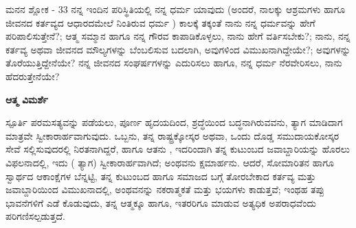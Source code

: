 \begin{mananam}{\mananamfont ಮನನ ಶ್ಲೋಕ - \textenglish{33}}
\footnotesize \mananamtext ನನ್ನ ಇಂದಿನ ಪರಿಸ್ಥಿತಿಯಲ್ಲಿ ನನ್ನ ಧರ್ಮ ಯಾವುದು (ಅಂದರೆ, ನಾಲಕ್ಕು ಆಶ್ರಮಗಳು ಹಾಗೂ ಜೀವನದ ಕರ್ತವ್ಯದ ಆಧಾರದಮೇಲೆ ನಿಂತಿರುವ ಧರ್ಮ ) ಕಾಲಕ್ಕೆ ತಕ್ಕಂತೆ ನಾನು ನನ್ನ ಧರ್ಮವನ್ನು ಹೇಗೆ ಪರಿಪಾಲಿಸುತ್ತೇನೆ?; ಆತ್ಮ ಸಮ್ಮಾನ ಹಾಗೂ ನನ್ನ ಗೌರವ ಕಾಪಾಡಿಕೊಳ್ಳಲು, ನಾನು ಹೇಗೆ ವರ್ತಿಸಬೇಕು?; ನಾನು, ನನ್ನ ಕರ್ತವ್ಯ ಅಥವಾ ಜೀವನದ ಮೌಲ್ಯಗಳನ್ನು ಬೆಂಬಲಿಸುವ ಬದಲಾಗಿ, ಅವುಗಳಿಂದ ವಿಮುಖನಾಗಿದ್ದೇಯೇ?; ಅವುಗಳನ್ನು ತೊರೆಯುತ್ತಿದ್ದೇನೆಯೇ? ನನ್ನ ಜೀವನದ ಸಂಘರ್ಷಗಳನ್ನು ಎದುರಿಸಲು ಹಾಗೂ, ನನ್ನ ಧರ್ಮ ನೆರವೇರಿಸಲು, ನಾನು ಹೆದರುತ್ತೇನೆಯೇ?
\end{mananam}
\WritingHand\enspace\textbf{ಆತ್ಮ ವಿಮರ್ಶೆ}
\begin{inspiration}{\mananamfont ಸ್ಪೂರ್ತಿ}
\footnotesize \mananamtext ಪರಮಸತ್ಯವನ್ನು ಪಡೆಯಲು, ಪೂರ್ಣ ಹೃದಯದಿಂದ, ಶ್ರದ್ಧೆಯಿಂದ ಬದ್ಧನಾಗಿರುವವನು, ತ್ಯಾಗ ಮಾಡಿದಾಗ ಮಾತ್ರವೇ ಸ್ವೀಕಾರಾರ್ಹವಾಗುವುದು. ಒಬ್ಬನು, ತನ್ನ ರಾಷ್ಟ್ರಕ್ಕೋಸ್ಕರ ಅಥವಾ, ಒಂದು ದೊಡ್ಡ ಸಮುದಾಯಕೋಸ್ಕರ ಸೇವೆ ಸಲ್ಲಿಸುವುದರಲ್ಲಿ ನಿರತನಾಗಿದ್ದರೆ, ಹಾಗೂ ಆತನು , ಇದರಿಂದಾಗಿ ತನ್ನ ಕುಟುಂಬದ ಜವಾಬ್ದಾರಿಯನ್ನು ಹೊರಲು ವಿಫಲನಾದಲ್ಲಿ, ಇದು ( ತ್ಯಾಗ) ಸ್ವೀಕಾರಾರ್ಹವಾಗಿದೆ; ಅಂಥವನು ಕ್ಷಮಾರ್ಹನು. ಆದರೆ, ಸೋಮಾರಿತನ ಹಾಗೂ ಸ್ವಾರ್ಥದ ಆಕಾಂಕ್ಷೆಗಳ ಬೆನ್ನಟ್ಟಿ, ತನ್ನ ಕುಟುಂಬದ ಹಾಗೂ ಸಮಾಜದ ಬಗ್ಗೆ ತೋರಬೇಕಾದ ಕರ್ತವ್ಯ  ಮತ್ತು ಜವಾಬ್ದಾರಿಯಿಂದ ವಿಮುಖನಾದಲ್ಲಿ, ಅಂಥವನನ್ನು ನಕರಾತ್ಮಕತೆ ಮತ್ತು ಭಯಗಳು ಕಾಡುತ್ತವೆ; ಇಂಥಹ ತಪ್ಪು ಭಾವನೆಗಳಿಗೆ ಎಡೆ ಕೊಡುವುದು, ತನ್ನ ಆತ್ಮಕ್ಕೂ ಹಾಗೂ, ಇತರರಿಗೂ ಮಾಡುವ ಅತ್ಯಧಿಕ ಅಪರಾಧವೆಂದು ಪರಿಗಣಿಸಲ್ಪಡುತ್ತದೆ. 
\end{inspiration}
\newpage


